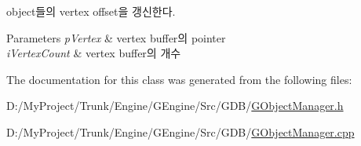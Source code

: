 \begin{DoxyItemize}
\item object들의 vertex offset을 갱신한다. 
\end{DoxyItemize}
\begin{DoxyParams}{Parameters}
{\em p\+Vertex} & vertex buffer의 pointer \\
\hline
{\em i\+Vertex\+Count} & vertex buffer의 개수 \\
\hline
\end{DoxyParams}


The documentation for this class was generated from the following files\+:\begin{DoxyCompactItemize}
\item 
D\+:/\+My\+Project/\+Trunk/\+Engine/\+G\+Engine/\+Src/\+G\+D\+B/\hyperlink{_g_object_manager_8h}{G\+Object\+Manager.\+h}\item 
D\+:/\+My\+Project/\+Trunk/\+Engine/\+G\+Engine/\+Src/\+G\+D\+B/\hyperlink{_g_object_manager_8cpp}{G\+Object\+Manager.\+cpp}\end{DoxyCompactItemize}
